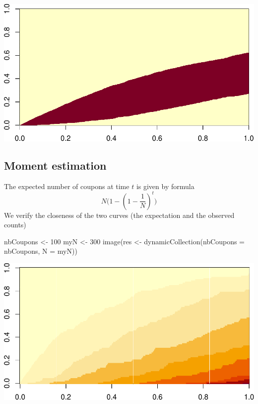\documentclass[
]{article}
\newenvironment{Shaded}{\begin{snugshade}}{\end{snugshade}}
\newcommand{\AttributeTok}[1]{\textcolor[rgb]{0.77,0.63,0.00}{#1}}
\newcommand{\DecValTok}[1]{\textcolor[rgb]{0.00,0.00,0.81}{#1}}
\newcommand{\FunctionTok}[1]{\textcolor[rgb]{0.00,0.00,0.00}{#1}}
\newcommand{\NormalTok}[1]{#1}
\newcommand{\OtherTok}[1]{\textcolor[rgb]{0.56,0.35,0.01}{#1}}
\begin{document}
\includegraphics{examples_files/figure-latex/unnamed-chunk-5-3.pdf}

\hypertarget{moment-estimation}{%
\subsection{Moment estimation}\label{moment-estimation}}

The expected number of coupons at time \(t\) is given by formula
\[N\Big(1- (1-\frac{1}{N})^t\Big)\] We verify the closeness of the two
curves (the expectation and the observed counts)

\begin{Shaded}
\begin{Highlighting}[]
\NormalTok{nbCoupons }\OtherTok{\textless{}{-}} \DecValTok{100}
\NormalTok{myN }\OtherTok{\textless{}{-}} \DecValTok{300}
\FunctionTok{image}\NormalTok{(res }\OtherTok{\textless{}{-}} \FunctionTok{dynamicCollection}\NormalTok{(}\AttributeTok{nbCoupons =}\NormalTok{ nbCoupons, }\AttributeTok{N =}\NormalTok{ myN))}
\end{Highlighting}
\end{Shaded}

\includegraphics{examples_files/figure-latex/unnamed-chunk-6-1.pdf}
\end{document}
